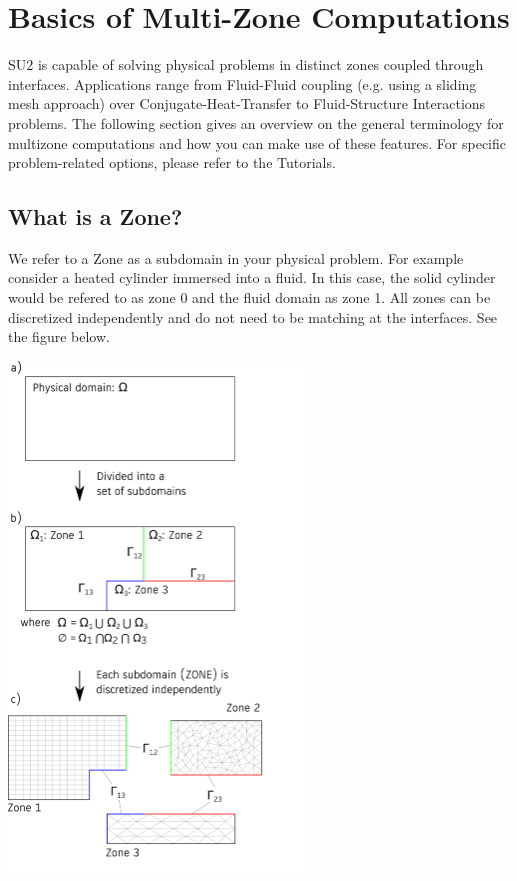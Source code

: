 \documentclass{article}
\begin{document}
\newpage
\section{Basics of Multi-Zone Computations}
SU2 is capable of solving physical problems in distinct zones coupled through interfaces. Applications range from Fluid-Fluid coupling (e.g. using a sliding mesh approach) over Conjugate-Heat-Transfer to Fluid-Structure Interactions problems. The following section gives an overview on the general terminology for multizone computations and how you can make use of these features. For specific problem-related options, please refer to the Tutorials.

\subsection{What is a Zone?}
We refer to a Zone as a subdomain in your physical problem. For example consider a heated cylinder immersed into a fluid. In this case, the solid cylinder would be refered to as zone 0 and the fluid domain as zone 1. All zones can be discretized independently and do not need to be matching at the interfaces. See the figure below.

\begin{center}
    \includegraphics[width=8cm]{Figures/zones.png}
\end{center}
\end{document}
